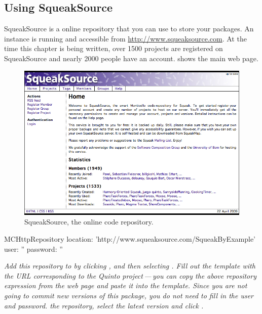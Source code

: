 \documentclass[a4paper,10pt,twoside]{book}
\begin{document}

\subsection{Using SqueakSource}

SqueakSource is a online repository that you can use to store your \MC packages. An instance is running and accessible from \url{http://www.squeaksource.com}. At the time this chapter is being written, over 1500 projects are registered on SqueakSource and nearly 2000 people have an account.  shows the main web page.  

\begin{figure}[ht]\centering
	\includegraphics[width=.75\textwidth]{squeaksource2}
	\caption{SqueakSource, the online \MC code repository.}
\end{figure}


\begin{code}{}
MCHttpRepository
    location: 'http://www.squeaksource.com/SqueakByExample'
    user: ''
    password: ''
\end{code}
\noindent
\emph{Add this repository to \MC by clicking , and then selecting . Fill out the template with the URL corresponding to the Quinto project\,---\,you can copy the above repository expression from the web page and paste it into the template.
Since you are not going to commit new versions of this package, you do not need to fill in the user and password.
 the repository, select the latest version and click .}
\end{document}
